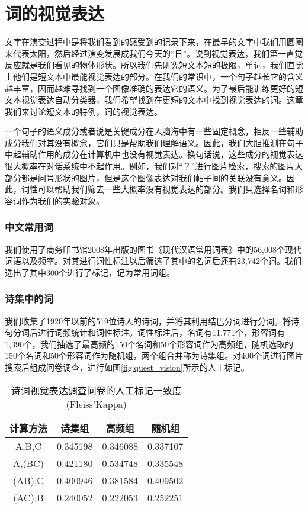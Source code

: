 \chapter{词的视觉表达}

文字在演变过程中是将我们看到的感受到的记录下来，在最早的文字中我们用圆圈来代表太阳，然后经过演变发展成我们今天的“日”。说到视觉表达，我们第一直觉反应就是我们看见的物体形状。所以我们先研究短文本短的极限，单词，我们直觉上他们是短文本中最能视觉表达的部分。在我们的常识中，一个句子越长它的含义越丰富，因而越难寻找到一个图像准确的表达它的语义。为了最后能训练更好的短文本视觉表达自动分类器，我们希望找到在更短的文本中找到视觉表达的词。这章我们来讨论短文本的特例，词的视觉表达。

一个句子的语义成分或者说是关键成分在人脑海中有一些固定概念，相反一些辅助成分我们对其没有概念，它们只是帮助我们理解语义。因此，我们大胆推测在句子中起辅助作用的成分在计算机中也没有视觉表达。换句话说，这些成分的视觉表达很大概率在对话系统中不起作用。例如，我们对“？”进行图片检索，搜索的图片大部分都是问号形状的图片，但是这个图像表达对我们帖子间的关联没有意义。\cite{song2009identification}因此，词性可以帮助我们筛去一些大概率没有视觉表达的部分。我们只选择名词和形容词作为我们的实验对象。

\subsection{中文常用词}
我们使用了商务印书馆2008年出版的图书《现代汉语常用词表》中的56,008个现代词语以及频率。对其进行词性标注以后筛选了其中的名词后还有23,742个词。我们选出了其中300个进行了标记，记为常用词组。

\subsection{诗集中的词}
我们收集了1920年以前的519位诗人的诗词，并将其利用结巴分词进行分词。将诗句分词后进行词频统计和词性标注。词性标注后，名词有11,771个，形容词有1,390个，我们抽选了最高频的150个名词和50个形容词作为高频组，随机选取的150个名词和50个形容词作为随机组，两个组合并称为诗集组。对400个词进行图片搜索后组成问卷调查，进行如图\ref{fig:quest_vision}所示的人工标记。

\begin{table}[htbp]
\centering
\caption{诗词视觉表达调查问卷的人工标记一致度(Fleiss'Kappa)} \label{tab:poem_label_kappa}
\begin{tabular}{|c|c|c|c|}
    \hline
		计算方法 & 诗集组 &  高频组 &  随机组  \\
	\hline
		A,B,C 	&  0.345198 &  0.346088 &  0.337107 \\
	\hline
		A,(BC)  &  0.421180 & 	0.534748 & 0.335548 \\
	\hline
		(AB),C  &  0.400946 & 0.381584 &  0.409502	\\
	\hline
		(AC),B  &  0.240052 & 0.222053 & 0.252251	\\
 	\hline
\end{tabular}
\end{table}


